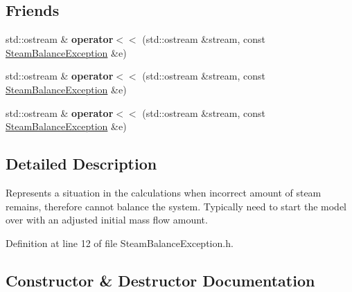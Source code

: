 \subsection*{Friends}
\begin{DoxyCompactItemize}
\item 
\mbox{\label{class_steam_balance_exception_ad463d6d7f37a2033165cc543b7ced72f}} 
std\+::ostream \& {\bfseries operator$<$$<$} (std\+::ostream \&stream, const \hyperlink{class_steam_balance_exception}{Steam\+Balance\+Exception} \&e)
\item 
\mbox{\label{class_steam_balance_exception_ad463d6d7f37a2033165cc543b7ced72f}} 
std\+::ostream \& {\bfseries operator$<$$<$} (std\+::ostream \&stream, const \hyperlink{class_steam_balance_exception}{Steam\+Balance\+Exception} \&e)
\item 
\mbox{\label{class_steam_balance_exception_ad463d6d7f37a2033165cc543b7ced72f}} 
std\+::ostream \& {\bfseries operator$<$$<$} (std\+::ostream \&stream, const \hyperlink{class_steam_balance_exception}{Steam\+Balance\+Exception} \&e)
\end{DoxyCompactItemize}


\subsection{Detailed Description}
Represents a situation in the calculations when incorrect amount of steam remains, therefore cannot balance the system. Typically need to start the model over with an adjusted initial mass flow amount. 

Definition at line 12 of file Steam\+Balance\+Exception.\+h.



\subsection{Constructor \& Destructor Documentation}
\mbox{\label{class_steam_balance_exception_ac86eb72f6c1e138ae22f9ab97646e8b3}} 
